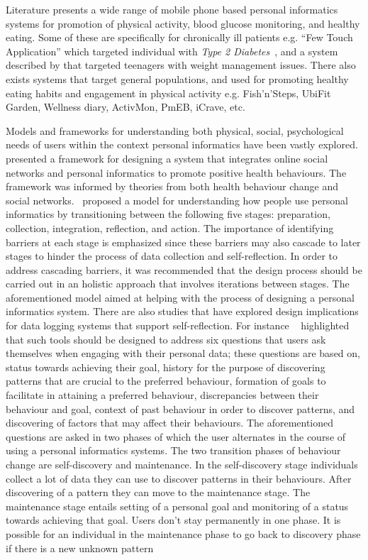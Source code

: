 Literature presents a wide range of mobile phone based personal informatics systems for promotion of physical activity, blood glucose monitoring, and healthy eating. Some of these are specifically for chronically ill patients e.g. ``Few Touch Application'' which targeted individual with  \emph{Type 2 Diabetes}~\citep{arsand:mobile}, and a system described by \cite{arteaga2010:persuasive} that targeted teenagers with weight management issues. There also exists systems that target general populations, and used for promoting healthy eating habits and engagement in physical activity e.g. Fish'n'Steps\citep{lin2006:fish}, UbiFit Garden\citep{klasnja2009:using}, Wellness diary\citep{mattila2008mobile}, ActivMon\citep{burns2012using}, PmEB\citep{lee2006pmeb}, iCrave\citep{hsu2014persuasive}, etc. 

Models and frameworks for understanding both physical, social, psychological needs of users within the context personal informatics have been vastly explored.~\cite{kamal2010understanding} presented a framework for designing a system that integrates online social networks and personal informatics to promote positive health behaviours. The framework was informed by theories from both health behaviour change and social networks.~\cite{li2010stage} proposed a model for understanding how people use personal informatics by transitioning between the following five stages: preparation, collection, integration, reflection, and action. The importance of identifying barriers at each stage is emphasized since these barriers may also cascade to later stages to hinder the process of data collection and self-reflection. In order to address cascading barriers, it was recommended that the design process should be carried out in an holistic approach that involves iterations between stages. The aforementioned model aimed at helping with the process of designing a personal informatics system. There are also studies that have explored design implications for data logging systems that support self-reflection. For instance ~\cite{li2011understanding} highlighted that such tools should be designed to address six questions that users ask themselves when engaging with their personal data; these questions are based on, status towards achieving their goal, history for the purpose of discovering patterns that are crucial to the preferred behaviour, formation of goals to facilitate in attaining a preferred behaviour, discrepancies between their behaviour and goal, context of past behaviour in order to discover patterns, and discovering of factors that may affect their behaviours. The aforementioned questions are asked in two phases of which the user alternates in the course of using a personal informatics systems. The two transition phases of behaviour change are self-discovery and maintenance. In the self-discovery stage individuals collect a lot of data they can use to discover patterns in their behaviours. After discovering of a pattern they can move to the maintenance stage. The maintenance stage entails setting of a personal goal and monitoring of a status towards achieving that goal. Users don't stay permanently in one phase. It is possible for an individual in the maintenance phase to go back to discovery phase if there is a new unknown pattern 